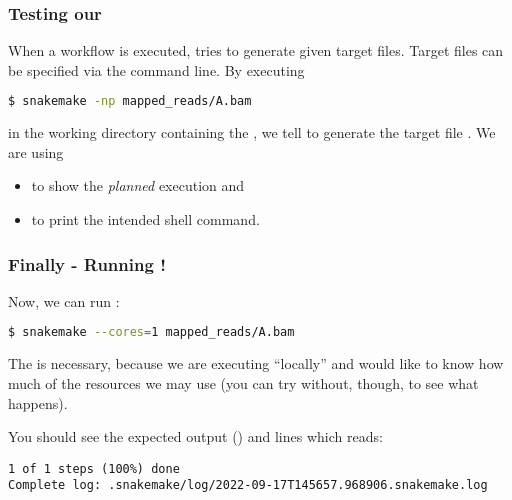 \begin{frame}[fragile]
  \frametitle{Testing our }
  When a workflow is executed, \Snakemake{} tries to generate given target files. Target files can be specified via the command line. By executing
  \begin{lstlisting}[language=Bash, style=Shell]
$ snakemake -np mapped_reads/A.bam
  \end{lstlisting}
  in the working directory containing the , we tell \Snakemake{} to generate the target file .\newline
  We are using 
  \begin{itemize}[<+->]
   \item {} to show the \emph{planned} execution and
   \item {} to print the intended shell command.
  \end{itemize} 
\end{frame}

\begin{frame}[fragile]
  \frametitle{Finally - Running \Snakemake{}!}
  Now, we can run \Snakemake{}:
  \begin{lstlisting}[language=Bash, style=Shell]
$ snakemake --cores=1 mapped_reads/A.bam
  \end{lstlisting}
  \begin{hint}[Note:]
  	The  is necessary, because we are executing ``locally'' and \Snakemake{} would like to know how much of the resources we may use (you can try without, though, to see what happens).
  \end{hint}
  You should see the expected output () and lines which reads:
  \begin{lstlisting}[style=Plain, basicstyle=\footnotesize]
1 of 1 steps (100%) done
Complete log: .snakemake/log/2022-09-17T145657.968906.snakemake.log
  \end{lstlisting}
\end{frame}

